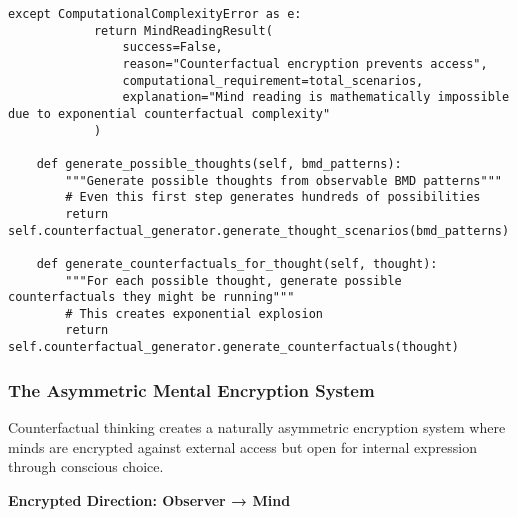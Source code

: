 \documentclass[12pt,a4paper]{article}
\begin{document}
\begin{lstlisting}[style=pythonstyle, caption=Demonstration of Mind Reading Computational Impossibility]
        except ComputationalComplexityError as e:
            return MindReadingResult(
                success=False,
                reason="Counterfactual encryption prevents access",
                computational_requirement=total_scenarios,
                explanation="Mind reading is mathematically impossible due to exponential counterfactual complexity"
            )
    
    def generate_possible_thoughts(self, bmd_patterns):
        """Generate possible thoughts from observable BMD patterns"""
        # Even this first step generates hundreds of possibilities
        return self.counterfactual_generator.generate_thought_scenarios(bmd_patterns)
    
    def generate_counterfactuals_for_thought(self, thought):
        """For each possible thought, generate possible counterfactuals they might be running"""
        # This creates exponential explosion
        return self.counterfactual_generator.generate_counterfactuals(thought)
\end{lstlisting}

\subsubsection{The Asymmetric Mental Encryption System}

Counterfactual thinking creates a naturally asymmetric encryption system where minds are encrypted against external access but open for internal expression through conscious choice.

\textbf{Encrypted Direction: Observer → Mind}
\end{document}
